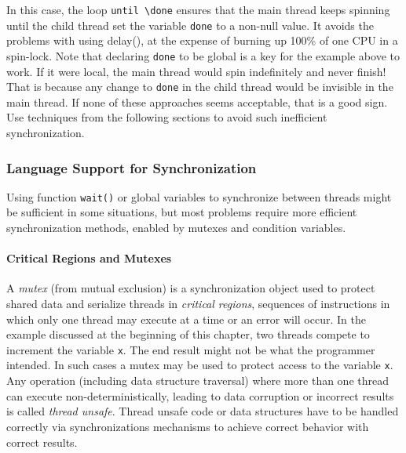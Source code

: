 
In this case, the loop \texttt{until
{\textbackslash}}\texttt{done} ensures that the main thread
keeps spinning until the child thread set the variable
\texttt{done} to a non-null value. It avoids the problems
with using delay(), at the expense of burning up 100\% of one CPU in a
spin-lock. Note that declaring \texttt{done} to be global is
a key for the example above to work. If it were local, the main thread
would spin indefinitely and never finish! That is because any change to
\texttt{done} in the child thread would be invisible in the
main thread. If none of these approaches seems acceptable, that is a
good sign. Use techniques from the following sections to avoid such
inefficient synchronization.

\subsubsection[Language Support for Synchronization]{Language Support
for Synchronization}

Using function \texttt{wait()} or global variables to synchronize between
threads might be sufficient in some situations, but most problems require
more efficient synchronization methods, enabled by mutexes and condition
variables.

\paragraph{Critical Regions and Mutexes}
A \textit{mutex} (from mutual exclusion) is a synchronization
object used to protect shared data and serialize threads in
\textit{critical regions}, sequences of instructions in which only
one thread may execute at a time or an error will occur. In the example
discussed at the beginning of this chapter, two threads compete
to increment the variable \texttt{x}. The end result might not be what the
programmer intended. In such cases a mutex may be used to protect
access to the variable \texttt{x}. Any operation (including
data structure traversal) where more than one thread can execute
non-deterministically, leading to data corruption or incorrect results
is called \textit{thread unsafe}. Thread unsafe code or data
structures have to be handled correctly via synchronizations mechanisms
to achieve correct behavior with correct results.

